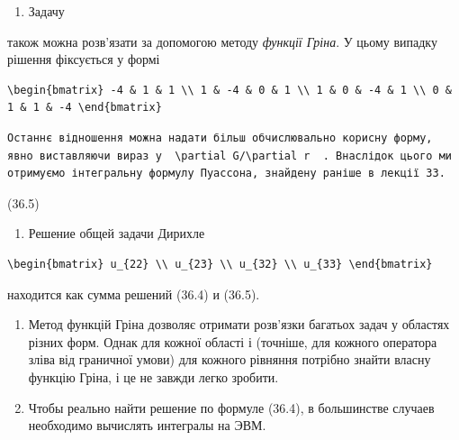 \documentclass[
  ukrainian,
]{article}
\providecommand{\tightlist}{%
  \setlength{\itemsep}{0pt}\setlength{\parskip}{0pt}}
\begin{document}
\begin{enumerate}
\def\labelenumi{\arabic{enumi}.}
\tightlist
\item
  Задачу
\end{enumerate}

також можна розв'язати за допомогою методу \emph{функції Гріна}. У цьому
випадку рішення фіксується у формі

\begin{verbatim}
\begin{bmatrix} -4 & 1 & 1 \\ 1 & -4 & 0 & 1 \\ 1 & 0 & -4 & 1 \\ 0 & 1 & 1 & -4 \end{bmatrix}
\end{verbatim}

\begin{verbatim}
Останнє відношення можна надати більш обчислювально корисну форму, явно виставляючи вираз у  \partial G/\partial r  . Внаслідок цього ми отримуємо інтегральну формулу Пуассона, знайдену раніше в лекції 33.
\end{verbatim}

(36.5)

\begin{enumerate}
\def\labelenumi{\arabic{enumi}.}
\setcounter{enumi}{1}
\tightlist
\item
  Решение общей задачи Дирихле
\end{enumerate}

\begin{verbatim}
\begin{bmatrix} u_{22} \\ u_{23} \\ u_{32} \\ u_{33} \end{bmatrix}
\end{verbatim}

находится как сумма решений (36.4) и (36.5).

\begin{enumerate}
\def\labelenumi{\arabic{enumi}.}
\setcounter{enumi}{2}
\item
  Метод функцій Гріна дозволяє отримати розв'язки багатьох задач у
  областях різних форм. Однак для кожної області і (точніше, для кожного
  оператора зліва від граничної умови) для кожного рівняння потрібно
  знайти власну функцію Гріна, і це не завжди легко зробити.
\item
  Чтобы реально найти решение по формуле (36.4), в большинстве случаев
  необходимо вычислять интегралы на ЭВМ.
\end{enumerate}
\end{document}
